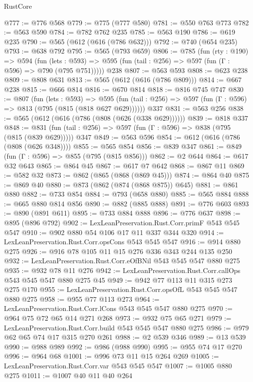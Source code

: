 \begin{lexlean}{RustCore}
\begin{coremodule}
{\begin{coremodule}
{{{{{{@777 := @776 @568
@779 := @775 (@777 @580)
@781 := @550 @763 @773
@782 := @563 @590
@784 := @782 @762 @235
@785 := @563 @190
@786 := @619 @235
@790 := @565 (@612 (@616 (@786 @632)))
@792 := @740 (@654 @235)
@793 := @638 @792
@795 := @565 (@793 @659)
@806 := @785
    (fun (rty : @190) =>
    @594
      (fun (lets : @593) => @595 (fun (tail : @256) => @597 (fun (Γ : @596) => @790 (@795 @751)))))
    @238
@807 := @563 @593
@808 := @623 @238
@809 := @808 @631
@813 := @565 (@612 (@616 (@786 @809)))
@814 := @667 @238
@815 := @666 @814
@816 := @670 @814
@818 := @816 @745 @747
@830 := @807
    (fun (lets : @593) =>
    @595 (fun (tail : @256) => @597 (fun (Γ : @596) => @813 (@795 (@815 (@818 @627 @629))))))
    @337
@831 := @563 @256
@838 := @565 (@612 (@616 (@786 (@808 (@626 (@338 @629))))))
@839 := @818 @337
@848 := @831 (fun (tail : @256) => @597 (fun (Γ : @596) => @838 (@795 (@815 (@839 @629))))) @347
@849 := @563 @596
@854 := @612 (@616 (@786 (@808 (@626 @348))))
@855 := @565 @854
@856 := @839 @347
@861 := @849 (fun (Γ : @596) => @855 (@795 (@815 @856)))
@862 := @2 @644
@864 := @617 @32 @643
@865 := @864 @45
@867 := @617 @7 @642
@868 := @867 @11
@869 := @582 @32
@873 := @862 (@865 (@868 (@869 @45)))
@874 := @864 @40
@875 := @869 @40
@880 := @873 (@862 (@874 (@868 @875)) @645)
@881 := @861 @880
@882 := @733 @854
@884 := @793 (@658 @880)
@885 := @565 @884
@888 := @665 @880 @814 @856
@890 := @882 (@885 @888)
@891 := @776 @603
@893 := @890 (@891 @611)
@895 := @733 @884 @888
@896 := @776 @637
@898 := @895 (@896 @792)
@902 := LexLeanPreservation.Rust.Corr.primF @543 @545 @547
@910 := @902 @880 @54 @106 @17 @11 @337 @344 @320
@914 := LexLeanPreservation.Rust.Corr.opsCons @543 @545 @547
@916 := @914 @880 @275
@926 := @916 @78 @105 @11 @15 @276 @336 @343 @244 @135 @250
@932 := LexLeanPreservation.Rust.Corr.eOfBNil @543 @545 @547 @880 @275
@935 := @932 @78 @11 @276
@942 := LexLeanPreservation.Rust.Corr.callOps @543 @545 @547 @880 @275 @45
@949 := @942 @77 @113 @11 @315 @273 @275 @170
@955 := LexLeanPreservation.Rust.Corr.opsOfL @543 @545 @547 @880 @275
@958 := @955 @77 @113 @273
@964 := LexLeanPreservation.Rust.Corr.lCons @543 @545 @547 @880 @275
@970 := @964 @75 @72 @65 @14 @271 @268
@973 := @932 @75 @65 @271
@979 := LexLeanPreservation.Rust.Corr.build @543 @545 @547 @880 @275
@986 := @979 @62 @65 @74 @17 @315 @270 @261
@988 := @2 @539 @346
@989 := @13 @539
@990 := @988 @989
@992 := @986 (@988 @990)
@995 := @955 @74 @17 @270
@996 := @964 @68
@1001 := @996 @73 @11 @15 @264 @269
@1005 := LexLeanPreservation.Rust.Corr.var @543 @545 @547
@1007 := @1005 @880 @275
@1011 := @1007 @40 @11 @40 @264
}}}}}}
\end{coremodule}}
\end{coremodule}
\end{lexlean}
